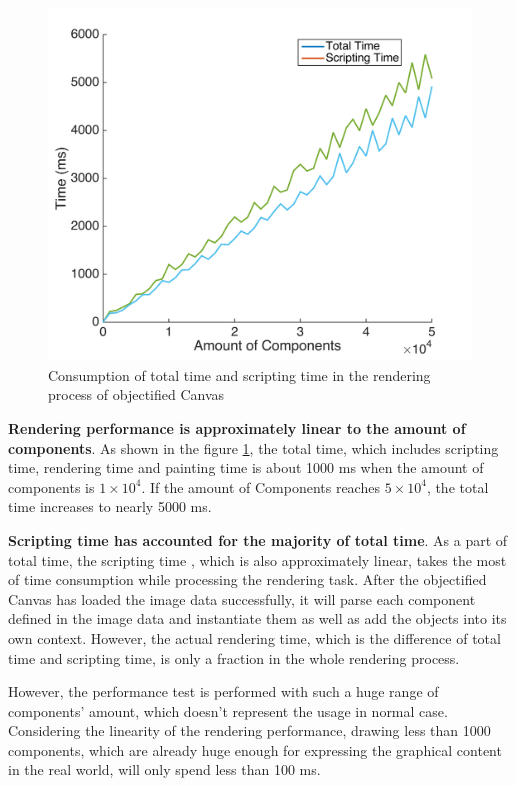 \begin{figure}[!htbp]
  \centering
    \includegraphics[width=1\textwidth]{Figures/eval-perf.png}
  \caption{Consumption of total time and scripting time in the rendering process of objectified Canvas}
  \label{fig:eval-perf}
\end{figure}


\textbf{Rendering performance is approximately linear to the amount of components}. As shown in the figure \ref{fig:eval-perf}, the total time, which includes scripting time, rendering time and painting time is about 1000 ms when the amount of components is $1\times 10^{4}$. If the amount of Components reaches $5\times 10^{4}$, the total time increases to nearly 5000 ms.

\textbf{Scripting time has accounted for the majority of total time}. As a part of total time, the scripting time , which is also approximately linear, takes the most of time consumption while processing the rendering task. After the objectified Canvas has loaded the image data successfully, it will parse each component defined in the image data and instantiate them as well as add the objects into its own context. However, the actual rendering time, which is the difference of total time and scripting time, is only a fraction in the whole rendering process.

However, the performance test is performed with such a huge range of components' amount, which doesn't represent the usage in normal case. Considering the linearity of the rendering performance, drawing less than 1000 components, which are already huge enough for expressing the graphical content in the real world, will only spend less than 100 ms.